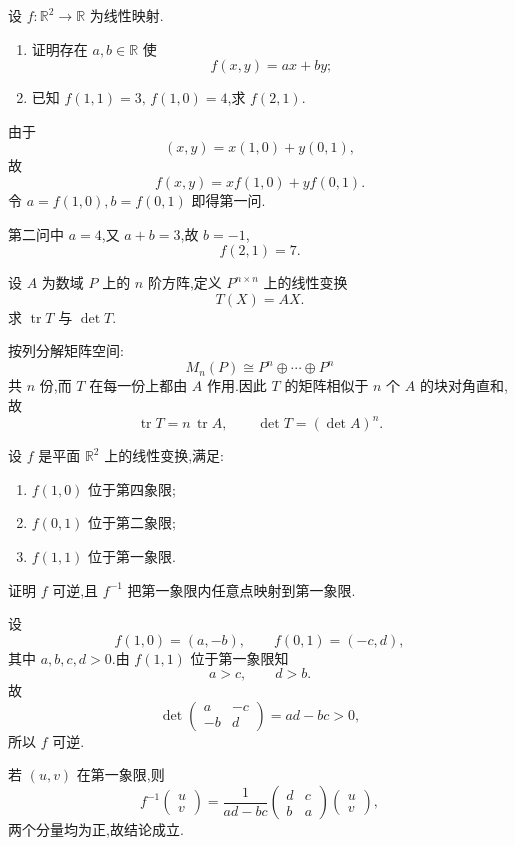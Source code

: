 \begin{example}
设 $f:\mathbb{R}^2\to\mathbb{R}$ 为线性映射.
\begin{enumerate}
    \item 证明存在 $a,b\in\mathbb{R}$ 使
    \[
    f(x,y)=ax+by;
    \]
    \item 已知 $f(1,1)=3,\,f(1,0)=4$,求 $f(2,1)$.
\end{enumerate}
\end{example}
\exampleblank

\begin{solution}
由于
\[
(x,y)=x(1,0)+y(0,1),
\]
故
\[
f(x,y)=xf(1,0)+yf(0,1).
\]
令 $a=f(1,0),b=f(0,1)$ 即得第一问.

第二问中 $a=4$,又 $a+b=3$,故 $b=-1$,
\[
\boxed{f(2,1)=7}.
\]
\end{solution}


\begin{example}[\markstar]
设 $A$ 为数域 $P$ 上的 $n$ 阶方阵,定义 $P^{n\times n}$ 上的线性变换
\[
T(X)=AX.
\]
求 $\operatorname{tr}T$ 与 $\det T$.
\end{example}
\exampleblank

\begin{solution}
按列分解矩阵空间:
\[
M_n(P)\cong P^n\oplus\cdots\oplus P^n
\]
共 $n$ 份,而 $T$ 在每一份上都由 $A$ 作用.因此 $T$ 的矩阵相似于
$n$ 个 $A$ 的块对角直和,故
\[
\boxed{
\operatorname{tr}T=n\,\operatorname{tr}A,
\qquad
\det T=(\det A)^n.
}
\]
\end{solution}


\begin{example}
设 $f$ 是平面 $\mathbb{R}^2$ 上的线性变换,满足:
\begin{enumerate}
    \item $f(1,0)$ 位于第四象限;
    \item $f(0,1)$ 位于第二象限;
    \item $f(1,1)$ 位于第一象限.
\end{enumerate}
证明 $f$ 可逆,且 $f^{-1}$ 把第一象限内任意点映射到第一象限.
\end{example}
\exampleblank

\begin{solution}
设
\[
f(1,0)=(a,-b),\qquad
f(0,1)=(-c,d),
\]
其中 $a,b,c,d>0$.由 $f(1,1)$ 位于第一象限知
\[
a>c,\qquad d>b.
\]
故
\[
\det
\begin{pmatrix}
a&-c\\
-b&d
\end{pmatrix}
=ad-bc>0,
\]
所以 $f$ 可逆.

若 $(u,v)$ 在第一象限,则
\[
f^{-1}
\begin{pmatrix}u\\v\end{pmatrix}
=
\dfrac{1}{ad-bc}
\begin{pmatrix}
d&c\\
b&a
\end{pmatrix}
\begin{pmatrix}u\\v\end{pmatrix},
\]
两个分量均为正,故结论成立.
\end{solution}


